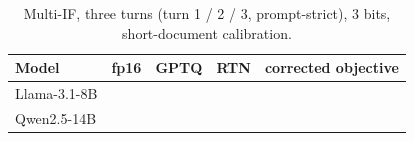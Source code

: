 \begin{table}[t]
\caption{Multi-IF, three turns (turn 1 / 2 / 3, prompt-strict), 3 bits, short-document calibration.}
\label{tab:multiif}
\begin{center}
\small
\begin{tabular}{lcccc}
\toprule
Model & fp16 & GPTQ & RTN & corrected objective \\
\midrule
Llama-3.1-8B & \LfpMIF{} & \LgptqMIF{} & \LrtnMIF{} & \LcorrMIF{} \\
Qwen2.5-14B  & \QfpMIF{} & \QgptqMIF{} & \QrtnMIF{} & \QcorrMIF{} \\
\bottomrule
\end{tabular}
\end{center}
\end{table}
